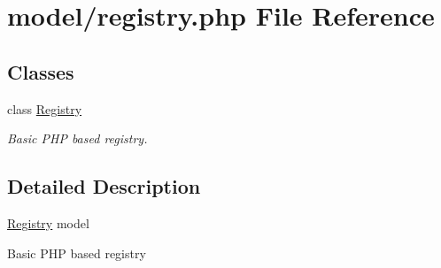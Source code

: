 \hypertarget{registry_8php}{\section{model/registry.php File Reference}
\label{registry_8php}
}
\subsection*{Classes}
\begin{DoxyCompactItemize}
\item 
class \hyperlink{classRegistry}{Registry}
\begin{DoxyCompactList}\small\item\em Basic P\-H\-P based registry. \end{DoxyCompactList}\end{DoxyCompactItemize}


\subsection{Detailed Description}
\hyperlink{classRegistry}{Registry} model

Basic P\-H\-P based registry 